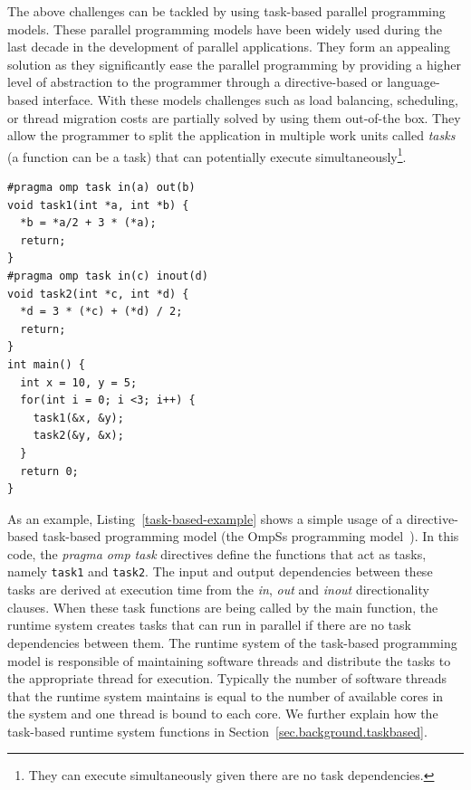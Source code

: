 The above challenges can be tackled by using task-based parallel programming models.
These parallel programming models have been widely used during the last decade in the development of parallel applications.
They form an appealing solution as they significantly ease the parallel programming by providing a higher level of abstraction to the programmer through a directive-based or language-based interface.
With these models challenges such as load balancing, scheduling, or thread migration costs are partially solved by using them out-of-the box.
They allow the programmer to split the application in multiple work units called \textit{tasks} (a function can be a task) that can potentially execute simultaneously\footnote{They can execute simultaneously given there are no task dependencies.}.
\begin{lstlisting}[float, captionpos=b, caption={Example code using the OmpSs task-based programming model.},
label=task_finish, emph={[2]mat}, emphstyle={[2]}, 
aboveskip={0\baselineskip}, 
frame=tb]
#pragma omp task in(a) out(b)
void task1(int *a, int *b) {
  *b = *a/2 + 3 * (*a);
  return;
}
#pragma omp task in(c) inout(d)
void task2(int *c, int *d) {
  *d = 3 * (*c) + (*d) / 2;
  return;
}
int main() { 
  int x = 10, y = 5;
  for(int i = 0; i <3; i++) {
    task1(&x, &y);
    task2(&y, &x);
  }
  return 0;
}
\end{lstlisting}
As an example, Listing~\ref{task-based-example} shows a simple usage of a directive-based task-based programming model (the OmpSs programming model~\cite{OmpSs}).
In this code, the \textit{pragma omp task} directives define the functions that act as tasks, namely \texttt{task1} and \texttt{task2}.
The input and output dependencies between these tasks are derived at execution time from the \textit{in}, \textit{out} and \textit{inout} directionality clauses.
When these task functions are being called by the main function, the runtime system creates tasks that can run in parallel if there are no task dependencies between them.
The runtime system of the task-based programming model is responsible of maintaining software threads and distribute the tasks to the appropriate thread for execution.
Typically the number of software threads that the runtime system maintains is equal to the number of available cores in the system and one thread is bound to each core.
We further explain how the task-based runtime system functions in Section~\ref{sec.background.taskbased}.


